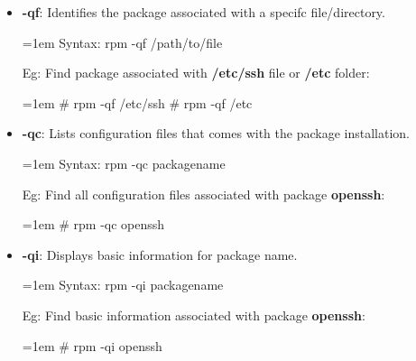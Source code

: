 \begin{flushleft}
\begin{itemize}
		
		\bigskip
		\bigskip
		\item \textbf{-qf}: Identifies the package associated with a specifc file/directory.
		\bigskip
		\begin{tcolorbox}[breakable,notitle,boxrule=-0pt,colback=pink,colframe=pink]
			\color{black}
			\font=1em
			Syntax: rpm -qf /path/to/file
			\font=4pt
		\end{tcolorbox}
		Eg: Find package associated with \textbf{/etc/ssh} file or \textbf{/etc} folder:
		\bigskip
		\begin{tcolorbox}[breakable,notitle,boxrule=-0pt,colback=black,colframe=black]
			\color{white}
			\font=1em
			\color{green}
			\# rpm -qf /etc/ssh
			\newline
			\# rpm -qf /etc
			\font=4pt
		\end{tcolorbox}
		

		\bigskip
		\bigskip
		\item \textbf{-qc}: Lists configuration files that comes with the package installation.
		\bigskip
		\begin{tcolorbox}[breakable,notitle,boxrule=-0pt,colback=pink,colframe=pink]
			\color{black}
			\font=1em
			Syntax: rpm -qc packagename
			\font=4pt
		\end{tcolorbox}
		Eg: Find all configuration files associated with package \textbf{openssh}:
		\bigskip
		\begin{tcolorbox}[breakable,notitle,boxrule=-0pt,colback=black,colframe=black]
			\color{white}
			\font=1em
			\color{green}
			\# rpm -qc openssh
			\font=4pt
		\end{tcolorbox}

		\bigskip
		\bigskip
		\item \textbf{-qi}: Displays basic information for package name.
		\bigskip
		\begin{tcolorbox}[breakable,notitle,boxrule=-0pt,colback=pink,colframe=pink]
			\color{black}
			\font=1em
			Syntax: rpm -qi packagename
			\font=4pt
		\end{tcolorbox}
		Eg: Find basic information associated with package \textbf{openssh}:
		\bigskip
		\begin{tcolorbox}[breakable,notitle,boxrule=-0pt,colback=black,colframe=black]
			\color{white}
			\font=1em
			\color{green}
			\# rpm -qi openssh
			\font=4pt
		\end{tcolorbox}


\end{itemize}
\end{flushleft}
